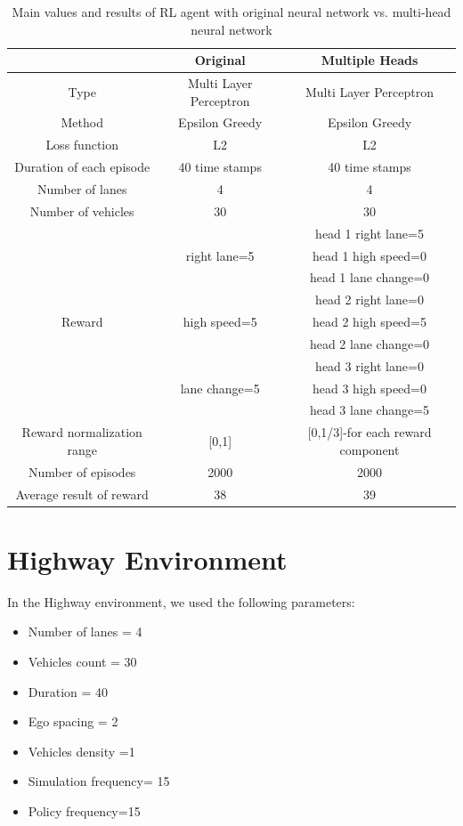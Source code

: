 \begin{table}[!ht]
\centering
\begin{tabular}{c|c c }
\hline

 & Original & Multiple Heads \\
\hline
Type & Multi Layer Perceptron & Multi Layer Perceptron\\

Method & Epsilon Greedy & Epsilon Greedy\\

Loss function & L2 & L2\\

Duration of each episode&40 time stamps&40 time stamps\\

Number of lanes & 4 & 4\\

Number of vehicles & 30 & 30\\
\hline
& & head 1 right lane=5\\
& right lane=5&  head 1 high speed=0\\
& &head 1 lane change=0\\ \cline{2-3}
& & head 2 right lane=0\\
Reward& high speed=5&  head 2 high speed=5\\
& & head 2 lane change=0\\ \cline{2-3}
& & head 3 right lane=0\\
& lane change=5 &  head 3 high speed=0\\
& &head 3 lane change=5\\ 
\hline
Reward normalization range &[0,1]&[0,1/3]-for each reward component\\

Number of episodes&2000&2000\\

Average result of reward & 38 & 39\\

\hline
\end{tabular}
\caption{Main values and results of RL agent with original neural network vs. multi-head neural network}
\label{tab:valus_Original_vs_Multi}
\end{table}

\section{Highway Environment}
\label{ap:highway_env}

In the Highway environment, we used the following parameters:
\begin{itemize}
\item Number of lanes = 4
\item Vehicles count = 30
\item Duration = 40
\item Ego spacing = 2
\item Vehicles density =1
\item Simulation frequency= 15
\item Policy frequency=15
\end{itemize}
